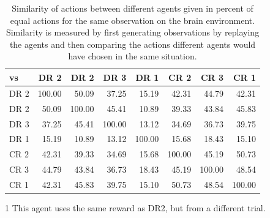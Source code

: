 \begin{table}[htp]
    \begin{center}
        \begin{threeparttable}
            \begin{tabular}{l|rrrrrrr}
                \toprule
                vs & DR 2 & DR 2\tnote{1} & DR 3 & DR 1 & CR 2 & CR 3 & CR 1 \\
                \midrule
                DR 2 & 100.00 & 50.09 & 37.25 & 15.19 & 42.31 & 44.79 & 42.31 \\
                DR 2\tnote{1} & 50.09 & 100.00 & 45.41 & 10.89 & 39.33 & 43.84 & 45.83 \\
                DR 3 & 37.25 & 45.41 & 100.00 & 13.12 & 34.69 & 36.73 & 39.75 \\
                DR 1 & 15.19 & 10.89 & 13.12 & 100.00 & 15.68 & 18.43 & 15.10 \\
                CR 2 & 42.31 & 39.33 & 34.69 & 15.68 & 100.00 & 45.19 & 50.73 \\
                CR 3 & 44.79 & 43.84 & 36.73 & 18.43 & 45.19 & 100.00 & 48.54 \\
                CR 1 & 42.31 & 45.83 & 39.75 & 15.10 & 50.73 & 48.54 & 100.00 \\
                \bottomrule
            \end{tabular}
            \begin{tablenotes} \footnotesize
                \item[1] This agent uses the same reward as DR2, but from a different trial.
            \end{tablenotes}
        \end{threeparttable}
    \end{center}
    \caption[Agent Action Similarity for Different Rewards]{Similarity of actions between different agents given in percent of equal actions for the same observation on the brain environment. Similarity is measured by first generating observations by replaying the agents and then comparing the actions different agents would have chosen in the same situation.} \label{tab:Maze0122/Reward/Similarity}
\end{table}

